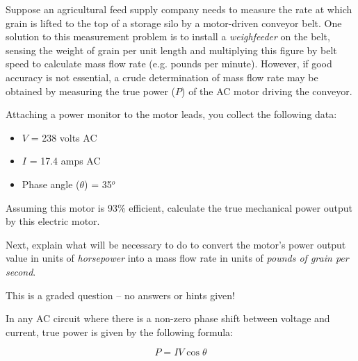 

Suppose an agricultural feed supply company needs to measure the rate at which grain is lifted to the top of a storage silo by a motor-driven conveyor belt.  One solution to this measurement problem is to install a {\it weighfeeder} on the belt, sensing the weight of grain per unit length and multiplying this figure by belt speed to calculate mass flow rate (e.g. pounds per minute).  However, if good accuracy is not essential, a crude determination of mass flow rate may be obtained by measuring the true power ($P$) of the AC motor driving the conveyor. 

\vskip 10pt

Attaching a power monitor to the motor leads, you collect the following data:

\begin{itemize}
\item{} $V$ = 238 volts AC
\item{} $I$ = 17.4 amps AC
\item{} Phase angle ($\theta$) = 35$^{o}$
\end{itemize}

Assuming this motor is 93\% efficient, calculate the true mechanical power output by this electric motor.

\vskip 10pt

Next, explain what will be necessary to do to convert the motor's power output value in units of {\it horsepower} into a mass flow rate in units of {\it pounds of grain per second}.

\vfil 

\eject






This is a graded question -- no answers or hints given!







In any AC circuit where there is a non-zero phase shift between voltage and current, true power is given by the following formula:

$$P = I V \cos \theta$$

